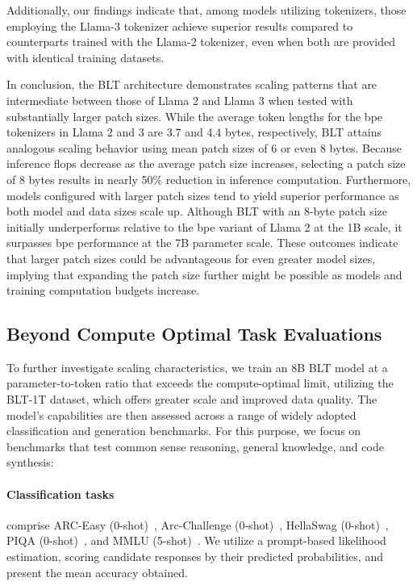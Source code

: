 Additionally, our findings indicate that, among models utilizing tokenizers, those employing the Llama-3 tokenizer achieve superior results compared to counterparts trained with the Llama-2 tokenizer, even when both are provided with identical training datasets.

In conclusion, the {\textsc BLT} architecture demonstrates scaling patterns that are intermediate between those of Llama 2 and Llama 3 when tested with substantially larger patch sizes. While the average token lengths for the bpe tokenizers in Llama 2 and 3 are 3.7 and 4.4 bytes, respectively, {\textsc BLT} attains analogous scaling behavior using mean patch sizes of 6 or even 8 bytes. Because inference flops decrease as the average patch size increases, selecting a patch size of 8 bytes results in nearly 50\% reduction in inference computation. Furthermore, models configured with larger patch sizes tend to yield superior performance as both model and data sizes scale up. Although {\textsc BLT} with an 8-byte patch size initially underperforms relative to the bpe variant of Llama 2 at the 1B scale, it surpasses bpe performance at the 7B parameter scale. These outcomes indicate that larger patch sizes could be advantageous for even greater model sizes, implying that expanding the patch size further might be possible as models and training computation budgets increase.

\subsection{Beyond Compute Optimal Task Evaluations}
\label{section:evals}
To further investigate scaling characteristics, we train an 8B {\textsc BLT} model at a parameter-to-token ratio that exceeds the compute-optimal limit, utilizing the {\textsc BLT}-1T dataset, which offers greater scale and improved data quality. The model's capabilities are then assessed across a range of widely adopted classification and generation benchmarks. For this purpose, we focus on benchmarks that test common sense reasoning, general knowledge, and code synthesis:
\paragraph{Classification tasks} comprise ARC-Easy (0-shot)~\citep{Eval_ARC}, Arc-Challenge (0-shot)~\citep{Eval_ARC}, HellaSwag (0-shot)~\citep{Eval_hellaswag}, PIQA (0-shot)~\citep{Eval_piqa}, and MMLU (5-shot)~\citep{hendrycks2020measuring}. We utilize a prompt-based likelihood estimation, scoring candidate responses by their predicted probabilities, and present the mean accuracy obtained.
